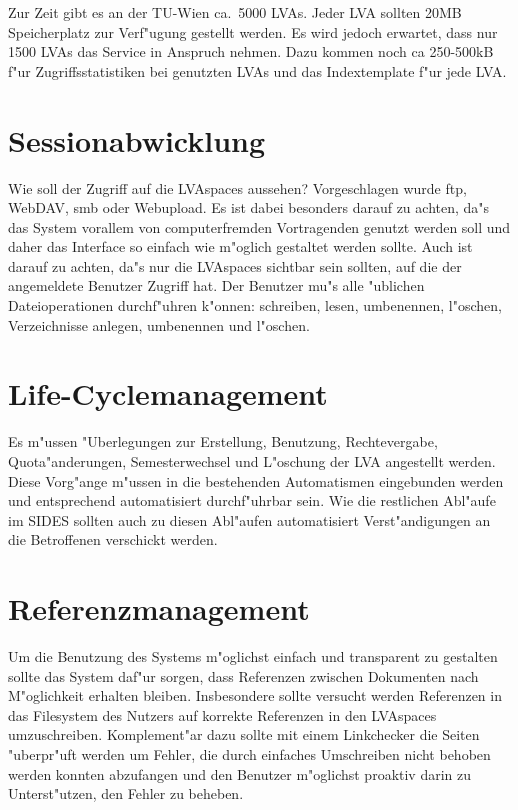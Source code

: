 \documentclass[12pt,a4paper]{article}
\begin{document}
Zur Zeit gibt es an der TU-Wien ca.~5000 LVAs. Jeder LVA sollten 20MB
Speicherplatz zur Verf"ugung gestellt werden. Es wird jedoch erwartet, dass
nur 1500 LVAs das Service in Anspruch nehmen. Dazu kommen noch ca 250-500kB
f"ur Zugriffsstatistiken bei genutzten LVAs und das Indextemplate f"ur jede
LVA.

\section{Sessionabwicklung}

Wie soll der Zugriff auf die LVAspaces aussehen? Vorgeschlagen wurde ftp,
WebDAV, smb oder Webupload. Es ist dabei besonders darauf zu achten, da"s
das System vorallem von computerfremden Vortragenden genutzt werden soll
und daher das Interface so einfach wie m"oglich gestaltet werden sollte.
Auch ist darauf zu achten, da"s nur die LVAspaces sichtbar sein sollten,
auf die der angemeldete Benutzer Zugriff hat. Der Benutzer mu"s alle
"ublichen Dateioperationen durchf"uhren k"onnen: schreiben, lesen,
umbenennen, l"oschen, Verzeichnisse anlegen, umbenennen und l"oschen.

\section{Life-Cyclemanagement}

Es m"ussen "Uberlegungen zur Erstellung, Benutzung, Rechtevergabe,
Quota"anderungen, Semesterwechsel und L"oschung der LVA angestellt werden.
Diese Vorg"ange m"ussen in die bestehenden Automatismen eingebunden werden
und entsprechend automatisiert durchf"uhrbar sein.  Wie die restlichen
Abl"aufe im SIDES sollten auch zu diesen Abl"aufen automatisiert
Verst"andigungen an die Betroffenen verschickt werden.

\section{Referenzmanagement}

Um die Benutzung des Systems m"oglichst einfach und transparent zu
gestalten sollte das System daf"ur sorgen, dass Referenzen zwischen
Dokumenten nach M"oglichkeit erhalten bleiben. Insbesondere sollte versucht
werden Referenzen in das Filesystem des Nutzers auf korrekte Referenzen in
den LVAspaces umzuschreiben. Komplement"ar dazu sollte mit einem
Linkchecker die Seiten "uberpr"uft werden um Fehler, die durch einfaches
Umschreiben nicht behoben werden konnten abzufangen und den Benutzer
m"oglichst proaktiv darin zu Unterst"utzen, den Fehler zu beheben.
\end{document}
